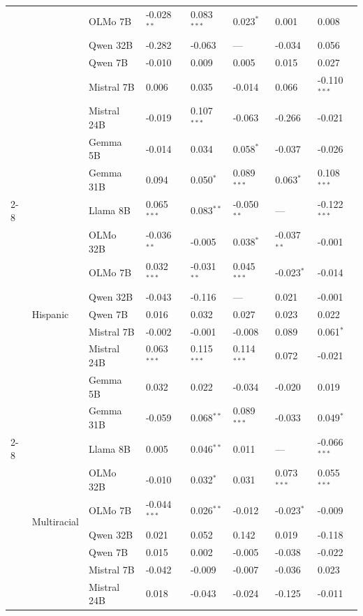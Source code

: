 \begin{longtable}[t]{llllllll}
 &  & OLMo 7B & -0.028$^{**}$ & 0.083$^{***}$ & 0.023$^{*}$ & 0.001 & 0.008 \\
 &  & Qwen 32B & -0.282 & -0.063 & --- & -0.034 & 0.056 \\
 &  & Qwen 7B & -0.010 & 0.009 & 0.005 & 0.015 & 0.027 \\
 &  & Mistral 7B & 0.006 & 0.035 & -0.014 & 0.066 & -0.110$^{***}$ \\
 &  & Mistral 24B & -0.019 & 0.107$^{***}$ & -0.063 & -0.266 & -0.021 \\
 &  & Gemma 5B & -0.014 & 0.034 & 0.058$^{*}$ & -0.037 & -0.026 \\
 &  & Gemma 31B & 0.094 & 0.050$^{*}$ & 0.089$^{***}$ & 0.063$^{*}$ & 0.108$^{***}$ \\
\cline{2-8}
 & \multirow[t]{9}{*}{Hispanic} & Llama 8B & 0.065$^{***}$ & 0.083$^{**}$ & -0.050$^{**}$ & --- & -0.122$^{***}$ \\
 &  & OLMo 32B & -0.036$^{**}$ & -0.005 & 0.038$^{*}$ & -0.037$^{**}$ & -0.001 \\
 &  & OLMo 7B & 0.032$^{***}$ & -0.031$^{**}$ & 0.045$^{***}$ & -0.023$^{*}$ & -0.014 \\
 &  & Qwen 32B & -0.043 & -0.116 & --- & 0.021 & -0.001 \\
 &  & Qwen 7B & 0.016 & 0.032 & 0.027 & 0.023 & 0.022 \\
 &  & Mistral 7B & -0.002 & -0.001 & -0.008 & 0.089 & 0.061$^{*}$ \\
 &  & Mistral 24B & 0.063$^{***}$ & 0.115$^{***}$ & 0.114$^{***}$ & 0.072 & -0.021 \\
 &  & Gemma 5B & 0.032 & 0.022 & -0.034 & -0.020 & 0.019 \\
 &  & Gemma 31B & -0.059 & 0.068$^{**}$ & 0.089$^{***}$ & -0.033 & 0.049$^{*}$ \\
\cline{2-8}
 & \multirow[t]{9}{*}{Multiracial} & Llama 8B & 0.005 & 0.046$^{**}$ & 0.011 & --- & -0.066$^{***}$ \\
 &  & OLMo 32B & -0.010 & 0.032$^{*}$ & 0.031 & 0.073$^{***}$ & 0.055$^{***}$ \\
 &  & OLMo 7B & -0.044$^{***}$ & 0.026$^{**}$ & -0.012 & -0.023$^{*}$ & -0.009 \\
 &  & Qwen 32B & 0.021 & 0.052 & 0.142 & 0.019 & -0.118 \\
 &  & Qwen 7B & 0.015 & 0.002 & -0.005 & -0.038 & -0.022 \\
 &  & Mistral 7B & -0.042 & -0.009 & -0.007 & -0.036 & 0.023 \\
 &  & Mistral 24B & 0.018 & -0.043 & -0.024 & -0.125 & -0.011 \\

\end{longtable}
